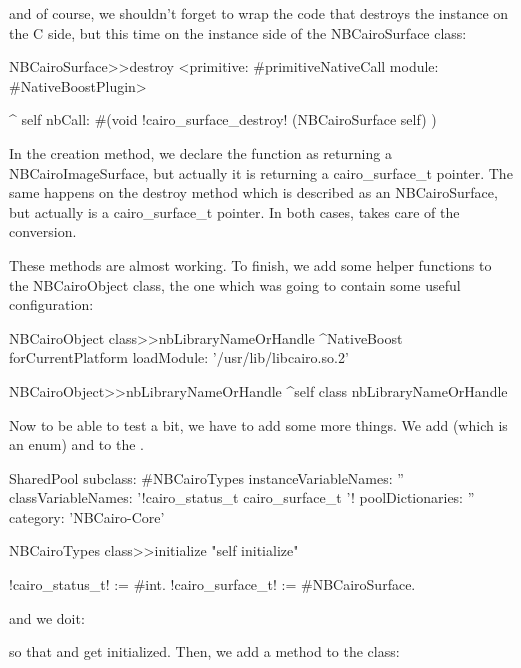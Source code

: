 \documentclass[a4paper,10pt,twoside]{book}
\begin{document}
and of course, we shouldn't forget to wrap the code that destroys the instance on the C side, but this time on the instance side of the NBCairoSurface class:

\begin{code}{}
NBCairoSurface>>destroy
	<primitive: #primitiveNativeCall module: #NativeBoostPlugin>
	
	^ self nbCall: #(void !cairo\_surface\_destroy! (NBCairoSurface self) )

\end{code}

In the creation method, we declare the function as returning a
NBCairoImageSurface, but actually it is returning a cairo\_surface\_t
pointer. The same happens on the destroy method which is described
as an NBCairoSurface, but actually is a cairo\_surface\_t pointer.
In both cases, \NativeBoost takes care of the conversion.




These methods are almost working. To finish, we add some helper
functions to the NBCairoObject class, the one which was going
to contain some useful configuration:

\begin{code}{}
NBCairoObject class>>nbLibraryNameOrHandle
	^NativeBoost forCurrentPlatform loadModule: '/usr/lib/libcairo.so.2'

NBCairoObject>>nbLibraryNameOrHandle
	^self class nbLibraryNameOrHandle

\end{code}

Now to be able to test a bit, we have to add some more things. We add
 (which is an enum) and  to the
.

   
\begin{classdef}{}
SharedPool subclass: #NBCairoTypes
	instanceVariableNames: ''
	classVariableNames: '!cairo\_status\_t cairo\_surface\_t '!
	poolDictionaries: ''
	category: 'NBCairo-Core'
\end{classdef}

\begin{code}{}
NBCairoTypes class>>initialize
  "self initialize"

  !cairo\_status\_t! := #int.
  !cairo\_surface\_t!  := #NBCairoSurface.
\end{code}

and we doit:


so that  and  get initialized.
Then, we add a method to the  class:
\end{document}

